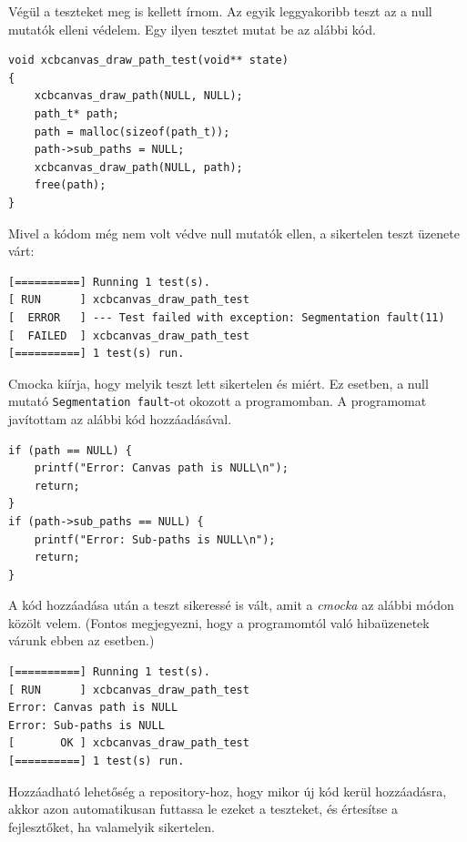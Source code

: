 Végül a teszteket meg is kellett írnom. Az egyik leggyakoribb teszt az a null mutatók elleni védelem. Egy ilyen tesztet mutat be az alábbi kód.

\begin{verbatim}
void xcbcanvas_draw_path_test(void** state)
{
    xcbcanvas_draw_path(NULL, NULL);
    path_t* path;
    path = malloc(sizeof(path_t));
    path->sub_paths = NULL;
    xcbcanvas_draw_path(NULL, path);
    free(path);
}
\end{verbatim}

Mivel a kódom még nem volt védve null mutatók ellen, a sikertelen teszt üzenete várt:

\begin{verbatim}
[==========] Running 1 test(s).
[ RUN      ] xcbcanvas_draw_path_test
[  ERROR   ] --- Test failed with exception: Segmentation fault(11)
[  FAILED  ] xcbcanvas_draw_path_test
[==========] 1 test(s) run.
\end{verbatim}

Cmocka kiírja, hogy melyik teszt lett sikertelen és miért. Ez esetben, a null mutató \texttt{Segmentation fault}-ot okozott a programomban. A programomat javítottam az alábbi kód hozzáadásával.

\begin{verbatim}
if (path == NULL) {
    printf("Error: Canvas path is NULL\n");
    return;
}
if (path->sub_paths == NULL) {
    printf("Error: Sub-paths is NULL\n");
    return;
}
\end{verbatim}

A kód hozzáadása után a teszt sikeressé is vált, amit a \textit{cmocka} az alábbi módon közölt velem. (Fontos megjegyezni, hogy a programomtól való hibaüzenetek várunk ebben az esetben.)

\begin{verbatim}
[==========] Running 1 test(s).
[ RUN      ] xcbcanvas_draw_path_test
Error: Canvas path is NULL
Error: Sub-paths is NULL
[       OK ] xcbcanvas_draw_path_test
[==========] 1 test(s) run.
\end{verbatim}

Hozzáadható lehetőség a repository-hoz, hogy mikor új kód kerül hozzáadásra, akkor azon automatikusan futtassa le ezeket a teszteket, és értesítse a fejlesztőket, ha valamelyik sikertelen.
